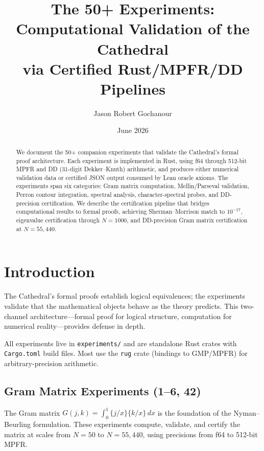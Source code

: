 \documentclass[11pt,a4paper]{article}
\title{%
  The 50+ Experiments:\\
  Computational Validation of the Cathedral\\
  via Certified Rust/MPFR/DD Pipelines%
}
\author{Jason Robert Gochanour}
\date{June 2026}
\begin{document}
\maketitle

\begin{abstract}
We document the 50+ companion experiments that validate the Cathedral's
formal proof architecture. Each experiment is implemented in Rust,
using f64 through 512-bit MPFR and DD (31-digit Dekker--Knuth)
arithmetic, and produces either
numerical validation data or certified JSON output consumed by Lean
oracle axioms. The experiments span six categories: Gram matrix
computation, Mellin/Parseval validation, Perron contour integration,
spectral analysis, character-spectral probes, and DD-precision
certification. We describe the
certification pipeline that bridges computational results to formal
proofs, achieving Sherman--Morrison match to $10^{-17}$,
eigenvalue certification through $N = 1000$, and DD-precision
Gram matrix certification at $N = 55{,}440$.
\end{abstract}



\section{Introduction}

The Cathedral's formal proofs establish logical equivalences; the
experiments validate that the mathematical objects behave as the
theory predicts. This two-channel architecture---formal proof for
logical structure, computation for numerical reality---provides
defense in depth.

All experiments live in \texttt{experiments/} and are standalone
Rust crates with \texttt{Cargo.toml} build files. Most use the
\texttt{rug} crate (bindings to GMP/MPFR) for arbitrary-precision
arithmetic.


\subsection{Gram Matrix Experiments (1--6, 42)}

The Gram matrix $G(j,k) = \int_0^1 \{j/x\}\{k/x\}\,dx$ is the
foundation of the Nyman--Beurling formulation. These experiments
compute, validate, and certify the matrix at scales from $N=50$
to $N=55{,}440$, using precisions from f64 to 512-bit MPFR.
\end{document}
